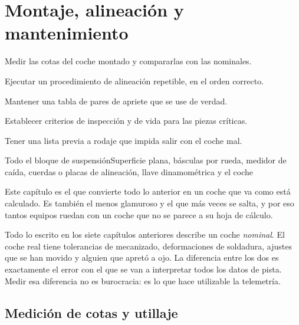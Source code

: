 \chapter{Montaje, alineación y mantenimiento}
\label{ch:montaje_alineacion}

\begin{objetivos}
  \item Medir las cotas del coche montado y compararlas con las nominales.
  \item Ejecutar un procedimiento de alineación repetible, en el orden correcto.
  \item Mantener una tabla de pares de apriete que se use de verdad.
  \item Establecer criterios de inspección y de vida para las piezas críticas.
  \item Tener una lista previa a rodaje que impida salir con el coche mal.
\end{objetivos}

%
{Todo el bloque de suspensión}{Superficie plana, básculas por rueda, medidor de
caída, cuerdas o placas de alineación, llave dinamométrica y el coche}

Este capítulo es el que convierte todo lo anterior en un coche que va como está
calculado. Es también el menos glamuroso y el que más veces se salta, y por eso
tantos equipos ruedan con un coche que no se parece a su hoja de cálculo.

\begin{clave}
Todo lo escrito en los siete capítulos anteriores describe un coche
\emph{nominal}. El coche real tiene tolerancias de mecanizado, deformaciones de
soldadura, ajustes que se han movido y alguien que apretó a ojo. La diferencia
entre los dos es exactamente el error con el que se van a interpretar todos los
datos de pista. Medir esa diferencia no es burocracia: es lo que hace utilizable
la telemetría.
\end{clave}

\section{Medición de cotas y utillaje}
\label{sec:montaje_alineacion:01}

